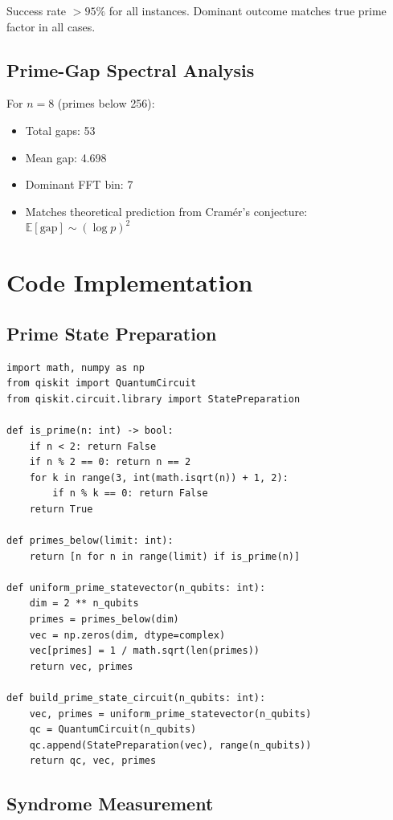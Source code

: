 \documentclass[11pt,letterpaper]{article}
\begin{document}
Success rate $> 95\%$ for all instances. Dominant outcome matches true prime factor in all cases.

\subsection{Prime-Gap Spectral Analysis}

For $n=8$ (primes below 256):
\begin{itemize}
\item Total gaps: 53
\item Mean gap: 4.698
\item Dominant FFT bin: 7
\item Matches theoretical prediction from Cramér's conjecture: $\mathbb{E}[\text{gap}] \sim (\log p)^2$
\end{itemize}

\section{Code Implementation}

\subsection{Prime State Preparation}

\begin{lstlisting}
import math, numpy as np
from qiskit import QuantumCircuit
from qiskit.circuit.library import StatePreparation

def is_prime(n: int) -> bool:
    if n < 2: return False
    if n % 2 == 0: return n == 2
    for k in range(3, int(math.isqrt(n)) + 1, 2):
        if n % k == 0: return False
    return True

def primes_below(limit: int):
    return [n for n in range(limit) if is_prime(n)]

def uniform_prime_statevector(n_qubits: int):
    dim = 2 ** n_qubits
    primes = primes_below(dim)
    vec = np.zeros(dim, dtype=complex)
    vec[primes] = 1 / math.sqrt(len(primes))
    return vec, primes

def build_prime_state_circuit(n_qubits: int):
    vec, primes = uniform_prime_statevector(n_qubits)
    qc = QuantumCircuit(n_qubits)
    qc.append(StatePreparation(vec), range(n_qubits))
    return qc, vec, primes
\end{lstlisting}

\subsection{Syndrome Measurement}
\end{document}
